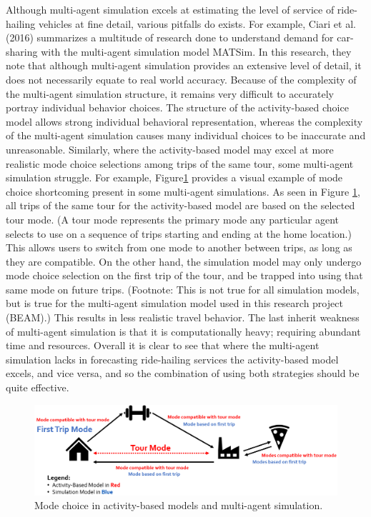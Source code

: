 \documentclass[fancy, masters]{byuthesis}
\begin{document}
Although multi-agent simulation excels at estimating the level of service of ride-hailing vehicles at fine detail, various pitfalls do exists. For example, Ciari et al. (2016) summarizes a multitude of research done to understand demand for car-sharing with the multi-agent simulation model MATSim. In this research, they note that although multi-agent simulation provides an extensive level of detail, it does not necessarily equate to real world accuracy. Because of the complexity of the multi-agent simulation structure, it remains very difficult to accurately portray individual behavior choices. The structure of the activity-based choice model allows strong individual behavioral representation, whereas the complexity of the multi-agent simulation causes many individual choices to be inaccurate and unreasonable. Similarly, where the activity-based model may excel at more realistic mode choice selections among trips of the same tour, some multi-agent simulation struggle. For example, Figure\ref{fig:fig-mode-compare} provides a visual example of mode choice shortcoming present in some multi-agent simulations. As seen in Figure \ref{fig:fig-mode-compare}, all trips of the same tour for the activity-based model are based on the selected tour mode. (A tour mode represents the primary mode any particular agent selects to use on a sequence of trips starting and ending at the home location.) This allows users to switch from one mode to another between trips, as long as they are compatible. On the other hand, the simulation model may only undergo mode choice selection on the first trip of the tour, and be trapped into using that same mode on future trips. (Footnote: This is not true for all simulation models, but is true for the multi-agent simulation model used in this research project (BEAM).) This results in less realistic travel behavior. The last inherit weakness of multi-agent simulation is that it is computationally heavy; requiring abundant time and resources. Overall it is clear to see that where the multi-agent simulation lacks in forecasting ride-hailing services the activity-based model excels, and vice versa, and so the combination of using both strategies should be quite effective.

\begin{figure}

{\centering \includegraphics[width=1\linewidth]{pics/abm-mas-compare} 

}

\caption{Mode choice in activity-based models and multi-agent simulation.}\label{fig:fig-mode-compare}
\end{figure}
\end{document}
